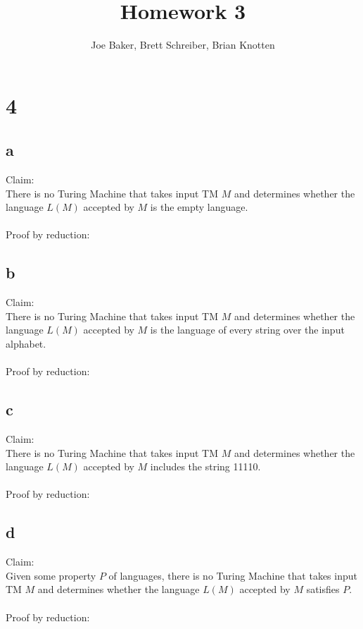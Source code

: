 \documentclass[letterpaper,notitlepage,twoside]{article}
\begin{document}
\title{Homework 3}
\author{Joe Baker, Brett Schreiber, Brian Knotten}
\maketitle

\section*{4}

\subsection*{a}
Claim:\\
There is no Turing Machine that takes input TM $M$ and determines whether the language $L(M)$ accepted by $M$ is the empty language.\\\\
Proof by reduction:\\

\subsection*{b}
Claim:\\
There is no Turing Machine that takes input TM $M$ and determines whether the language $L(M)$ accepted by $M$ is the language of every string over the input alphabet.\\\\
Proof by reduction:\\

\subsection*{c}
Claim:\\
There is no Turing Machine that takes input TM $M$ and determines whether the language $L(M)$ accepted by $M$ includes the string 11110.\\\\
Proof by reduction:\\

\subsection*{d}
Claim:\\
Given some property $P$ of languages, there is no Turing Machine that takes input TM $M$ and determines whether the language $L(M)$ accepted by $M$ satisfies $P$.\\\\
Proof by reduction:\\
\end{document}
